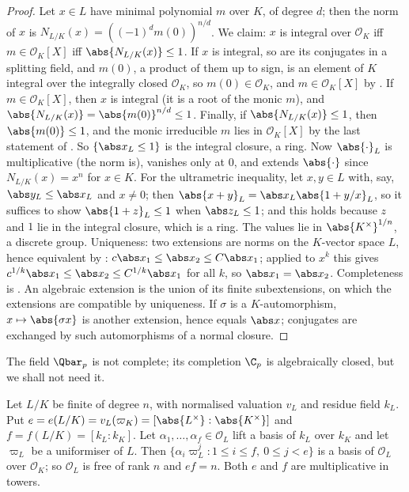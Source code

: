 \begin{proof}
Let $x\in L$ have minimal polynomial $m$ over $K$, of degree $d$; then the norm of $x$ is
$N_{L/K}(x)=((-1)^dm(0))^{n/d}$. We claim: $x$ is integral over $\mathcal O_K$ iff
$m\in\mathcal O_K[X]$ iff $\abs{N_{L/K}(x)}\le1$. If $x$ is integral, so are its conjugates in a splitting field, and $m(0)$, a product of them up
to sign, is an element of $K$ integral over the integrally closed $\mathcal O_K$, so $m(0)\in\mathcal O_K$, and $m\in\mathcal O_K[X]$ by
. If $m\in\mathcal O_K[X]$, then $x$ is integral (it is a root of the monic $m$), and
$\abs{N_{L/K}(x)}=\abs{m(0)}^{n/d}\le1$. Finally, if $\abs{N_{L/K}(x)}\le1$, then $\abs{m(0)}\le1$, and the monic irreducible $m$ lies in
$\mathcal O_K[X]$ by the last statement of . So $\{\abs x_L\le1\}$ is the integral closure, a ring. Now $\abs{\cdot}_L$ is
multiplicative (the norm is), vanishes only at $0$, and extends $\abs{\cdot}$ since $N_{L/K}(x)=x^n$ for $x\in K$. For the ultrametric inequality, let
$x,y\in L$ with, say, $\abs y_L\le\abs x_L$ and $x\ne0$; then $\abs{x+y}_L=\abs x_L\abs{1+y/x}_L$, so it suffices
to show $\abs{1+z}_L\le1$ when $\abs z_L\le1$; and this holds because $z$ and $1$ lie in the integral closure, which is a ring.
The values lie in $\abs{K^\times}^{1/n}$, a discrete group. Uniqueness: two extensions are norms on the $K$-vector space $L$, hence equivalent
by : $c\abs x_1\le\abs x_2\le C\abs x_1$; applied to $x^k$ this gives $c^{1/k}\abs x_1\le\abs x_2\le C^{1/k}\abs x_1$ for all $k$, so
$\abs x_1=\abs x_2$. Completeness is . An algebraic extension is the union of its finite subextensions, on which the
extensions are compatible by uniqueness. If $\sigma$ is a $K$-automorphism, $x\mapsto\abs{\sigma x}$ is another extension, hence equals $\abs x$;
conjugates are exchanged by such automorphisms of a normal closure.
\end{proof}

The field $\Qbar_p$ is not complete; its completion $\C_p$ is algebraically closed, but we shall not need it.

\begin{theorem}\label{thm:local:ef}
Let $L/K$ be finite of degree $n$, with normalised valuation $v_L$ and residue field $k_L$. Put $e=e(L/K)=v_L(\varpi_K)=[\abs{L^\times}:\abs{K^\times}]$ and
$f=f(L/K)=[k_L:k_K]$. Let $\alpha_1,\dots,\alpha_f\in\mathcal O_L$ lift a basis of $k_L$ over $k_K$ and let $\varpi_L$ be a uniformiser of $L$. Then
$\{\alpha_i\varpi_L^j:1\le i\le f,\ 0\le j<e\}$ is a basis of $\mathcal O_L$ over $\mathcal O_K$; so $\mathcal O_L$ is free of rank $n$ and $ef=n$. Both $e$
and $f$ are multiplicative in towers.
\end{theorem}

